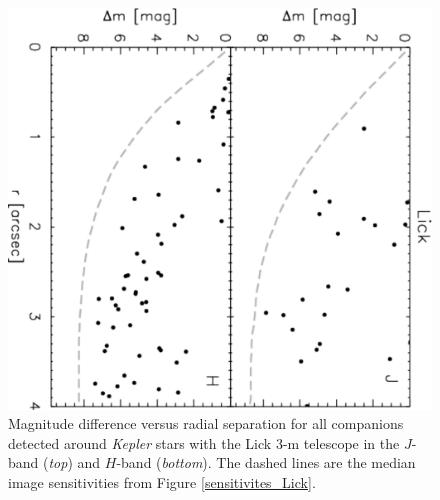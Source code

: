 \documentclass[twocolumn,appendixfloats]{aastex6}
\begin{document}
\begin{figure}[!t]
\centering
\includegraphics[angle=90, scale=0.48]{Lick_AO_multiples.pdf}
\caption{Magnitude difference versus radial separation for all companions detected
around {\it Kepler} stars with the Lick 3-m telescope in the $J$-band ({\it top})
and $H$-band ({\it bottom}). The dashed lines are the median image sensitivities
from Figure \ref{sensitivites_Lick}.
\label{KOIs_Lick}}
\end{figure}
\end{document}
